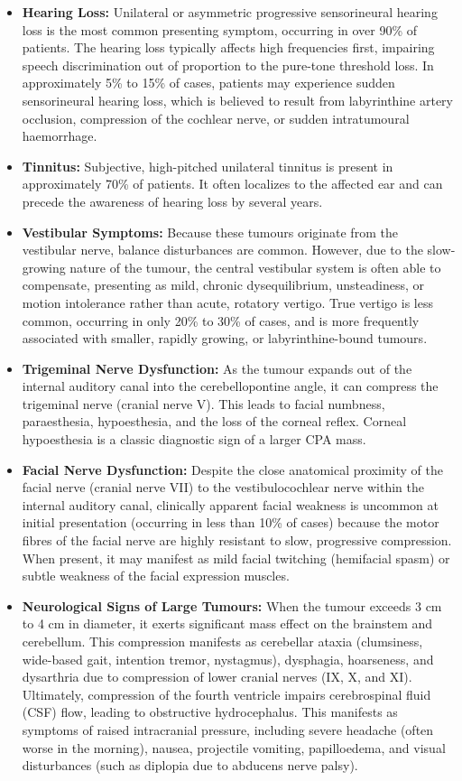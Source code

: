 \begin{itemize}
    \item \textbf{Hearing Loss:} Unilateral or asymmetric progressive sensorineural hearing loss is the most common presenting symptom, occurring in over 90\% of patients. The hearing loss typically affects high frequencies first, impairing speech discrimination out of proportion to the pure-tone threshold loss. In approximately 5\% to 15\% of cases, patients may experience sudden sensorineural hearing loss, which is believed to result from labyrinthine artery occlusion, compression of the cochlear nerve, or sudden intratumoural haemorrhage.
    \item \textbf{Tinnitus:} Subjective, high-pitched unilateral tinnitus is present in approximately 70\% of patients. It often localizes to the affected ear and can precede the awareness of hearing loss by several years.
    \item \textbf{Vestibular Symptoms:} Because these tumours originate from the vestibular nerve, balance disturbances are common. However, due to the slow-growing nature of the tumour, the central vestibular system is often able to compensate, presenting as mild, chronic dysequilibrium, unsteadiness, or motion intolerance rather than acute, rotatory vertigo. True vertigo is less common, occurring in only 20\% to 30\% of cases, and is more frequently associated with smaller, rapidly growing, or labyrinthine-bound tumours.
    \item \textbf{Trigeminal Nerve Dysfunction:} As the tumour expands out of the internal auditory canal into the cerebellopontine angle, it can compress the trigeminal nerve (cranial nerve V). This leads to facial numbness, paraesthesia, hypoesthesia, and the loss of the corneal reflex. Corneal hypoesthesia is a classic diagnostic sign of a larger CPA mass.
    \item \textbf{Facial Nerve Dysfunction:} Despite the close anatomical proximity of the facial nerve (cranial nerve VII) to the vestibulocochlear nerve within the internal auditory canal, clinically apparent facial weakness is uncommon at initial presentation (occurring in less than 10\% of cases) because the motor fibres of the facial nerve are highly resistant to slow, progressive compression. When present, it may manifest as mild facial twitching (hemifacial spasm) or subtle weakness of the facial expression muscles.
    \item \textbf{Neurological Signs of Large Tumours:} When the tumour exceeds 3 cm to 4 cm in diameter, it exerts significant mass effect on the brainstem and cerebellum. This compression manifests as cerebellar ataxia (clumsiness, wide-based gait, intention tremor, nystagmus), dysphagia, hoarseness, and dysarthria due to compression of lower cranial nerves (IX, X, and XI). Ultimately, compression of the fourth ventricle impairs cerebrospinal fluid (CSF) flow, leading to obstructive hydrocephalus. This manifests as symptoms of raised intracranial pressure, including severe headache (often worse in the morning), nausea, projectile vomiting, papilloedema, and visual disturbances (such as diplopia due to abducens nerve palsy).
\end{itemize}

